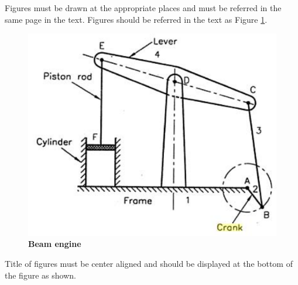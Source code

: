 \documentclass[BTech]{srmuthesis}
\begin{document}
    Figures must be drawn at the appropriate places and must be referred in the same page in the text. Figures should be referred in the text as Figure \ref{fig:beam}. 
      \begin{figure}[htpb]
      \centering
      \includegraphics[scale=0.5]{beam_engine.pdf}
      \caption{\bf Beam engine}
      \label{fig:beam}
      \end{figure}
      Title of figures must be center aligned and should be displayed at the bottom of the figure as shown. \\
      
\end{document}
